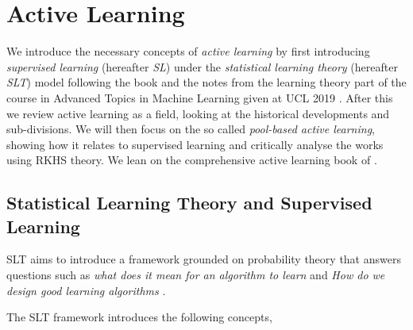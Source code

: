 \section{Active Learning} We introduce the necessary concepts of \textit{active learning}
by first introducing \textit{supervised learning} (hereafter \emph{SL}) under the
\textit{statistical learning theory} (hereafter \emph{SLT}) model following the book
\cite{shalev-shwartz14_under} and the notes from the learning theory part of the
course in Advanced Topics in Machine Learning given at UCL 2019
\cite{ciliberto18_advan_topic_machin_learn}. After this we review active
learning as a field, looking at the historical developments and sub-divisions.
We will then focus on the so called \emph{pool-based active learning}, showing
how it relates to supervised learning and critically analyse the works using
RKHS theory. We lean on the comprehensive active learning book of
\cite{settles12_activ_learn}.

\subsection{Statistical Learning Theory and Supervised Learning} SLT aims to
introduce a framework grounded on probability theory that answers questions such as
 \emph{what does it mean for an algorithm to learn} and \emph{How do we design
   good learning algorithms} \cite[Lecture 1]{ciliberto18_advan_topic_machin_learn}.

The SLT framework introduces the following concepts,

